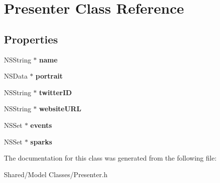 \hypertarget{interface_presenter}{
\section{Presenter Class Reference}
\label{interface_presenter}
}
\subsection*{Properties}
\begin{DoxyCompactItemize}
\item 
\hypertarget{interface_presenter_a0cdc66450fcd4dd873be53d4f230c736}{
NSString $\ast$ {\bfseries name}}
\label{interface_presenter_a0cdc66450fcd4dd873be53d4f230c736}

\item 
\hypertarget{interface_presenter_a1832f6e66606fa1ec474961ee74646ed}{
NSData $\ast$ {\bfseries portrait}}
\label{interface_presenter_a1832f6e66606fa1ec474961ee74646ed}

\item 
\hypertarget{interface_presenter_ae40f1b402228d35d9f157c922528c249}{
NSString $\ast$ {\bfseries twitterID}}
\label{interface_presenter_ae40f1b402228d35d9f157c922528c249}

\item 
\hypertarget{interface_presenter_a7e6b8d2fd5d346edb8ad6bd5f42c23f3}{
NSString $\ast$ {\bfseries websiteURL}}
\label{interface_presenter_a7e6b8d2fd5d346edb8ad6bd5f42c23f3}

\item 
\hypertarget{interface_presenter_a4d04f57843085e5eb53f9847a0c9c055}{
NSSet $\ast$ {\bfseries events}}
\label{interface_presenter_a4d04f57843085e5eb53f9847a0c9c055}

\item 
\hypertarget{interface_presenter_a7c46225fa83cefa5ece43f01460d094c}{
NSSet $\ast$ {\bfseries sparks}}
\label{interface_presenter_a7c46225fa83cefa5ece43f01460d094c}

\end{DoxyCompactItemize}


The documentation for this class was generated from the following file:\begin{DoxyCompactItemize}
\item 
Shared/Model Classes/Presenter.h\end{DoxyCompactItemize}
